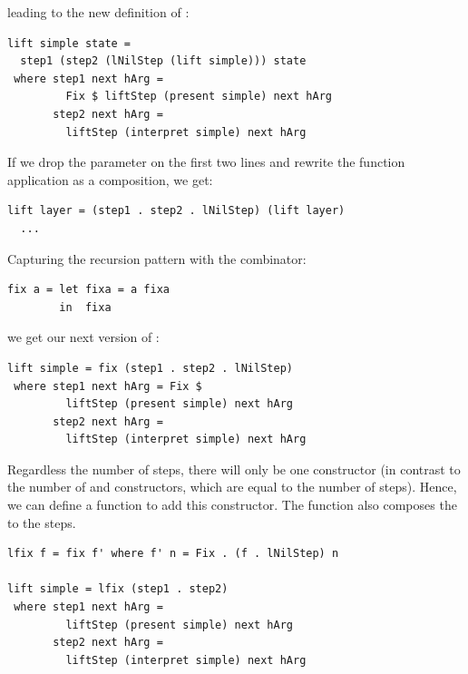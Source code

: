 \documentclass[preprint,natbib]{sigplanconf}
\begin{document}
\noindent leading to the new definition of :

\begin{small} %
\begin{verbatim}
lift simple state =
  step1 (step2 (lNilStep (lift simple))) state
 where step1 next hArg = 
         Fix $ liftStep (present simple) next hArg
       step2 next hArg =
         liftStep (interpret simple) next hArg 
\end{verbatim}%
\end{small}



If we drop the  parameter on the first two lines and rewrite the function application as a composition, we get:
\
\begin{small}
\begin{verbatim}
lift layer = (step1 . step2 . lNilStep) (lift layer)
  ...
\end{verbatim}
\end{small}

\noindent Capturing the recursion pattern with the  combinator:

\begin{small}
\begin{verbatim}
fix a = let fixa = a fixa
        in  fixa
\end{verbatim}
\end{small}

we get our next version of :

\begin{small} %
\begin{verbatim}
lift simple = fix (step1 . step2 . lNilStep)
 where step1 next hArg = Fix $
         liftStep (present simple) next hArg
       step2 next hArg =
         liftStep (interpret simple) next hArg
\end{verbatim}
\end{small}%


Regardless the number of steps, there will only be one  constructor (in contrast to the number of  and  constructors, which are equal to the number of steps). Hence, we can define a function  to add this constructor. The function  also composes the  to the steps. 

\begin{small}%
\begin{verbatim}
lfix f = fix f' where f' n = Fix . (f . lNilStep) n

lift simple = lfix (step1 . step2)
 where step1 next hArg = 
         liftStep (present simple) next hArg
       step2 next hArg = 
         liftStep (interpret simple) next hArg
\end{verbatim}
\end{small}
\end{document}
